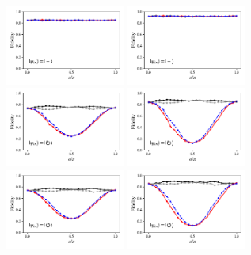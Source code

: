 \documentclass[a4paper]{article}
\begin{document}
\begin{figure}[H]
	\\
	\includegraphics[width=0.35\textwidth]{fidelity_qc1_mit1_state3}
	\includegraphics[width=0.35\textwidth]{fidelity_qc1_mit0_state3}
	\\
	\includegraphics[width=0.35\textwidth]{fidelity_qc1_mit1_state4}
	\includegraphics[width=0.35\textwidth]{fidelity_qc1_mit0_state4}
	\\
	\includegraphics[width=0.35\textwidth]{fidelity_qc1_mit1_state5}
	\includegraphics[width=0.35\textwidth]{fidelity_qc1_mit0_state5}
\end{figure}
\end{document}
